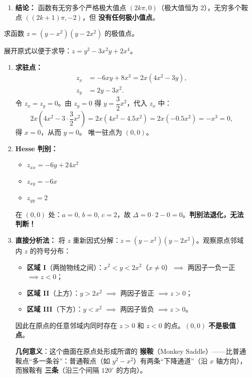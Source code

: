 \documentclass[lang=cn,11pt]{elegantbook}
\begin{document}
\begin{solution}
\begin{enumerate}
  \item \textbf{结论：}
  函数有无穷多个严格极大值点 $(2k\pi,0)$（极大值恒为 $2$），无穷多个鞍点 $((2k+1)\pi,-2)$，但 \textbf{没有任何极小值点}。
\end{enumerate}
\end{solution}

\begin{example} \label{ex:monkey-saddle}
求函数 $z=(y-x^2)(y-2x^2)$ 的极值点。
\end{example}

\begin{solution}
展开原式以便于求导：$z=y^2-3x^2y+2x^4$。

\begin{enumerate}
  \item \textbf{求驻点：}
  \begin{align*}
  z_x &= -6xy+8x^3=2x(4x^2-3y),\\
  z_y &= 2y-3x^2.
  \end{align*}
  令 $z_x=z_y=0$。由 $z_y=0$ 得 $y=\dfrac{3}{2}x^2$，代入 $z_x$ 中：
  \[
  2x\left(4x^2-3\cdot\frac{3}{2} x^2\right) = 2x(4x^2-4.5x^2) = 2x(-0.5x^2) = -x^3=0,
  \]
  得 $x=0$，从而 $y=0$。
  唯一驻点为 $(0,0)$。

  \item \textbf{Hesse 判别：}
  \begin{itemize}
    \item $z_{xx}=-6y+24x^2$
    \item $z_{xy}=-6x$
    \item $z_{yy}=2$
  \end{itemize}
  在 $(0,0)$ 处：$a=0$, $b=0$, $c=2$，故 $\Delta=0\cdot 2-0=0$。\textbf{判别法退化，无法判断！}

  \item \textbf{直接分析法：}
  将 $z$ 重新因式分解：$z=(y-x^2)(y-2x^2)$。观察原点邻域内 $z$ 的符号分布：
  \begin{itemize}
    \item \textbf{区域 I}（两抛物线之间）：$x^2<y<2x^2$（$x \neq 0$）$\implies$ 两因子一负一正 $\implies z<0$；
    \item \textbf{区域 II}（上方）：$y>2x^2$ $\implies$ 两因子皆正 $\implies z>0$；
    \item \textbf{区域 III}（下方）：$y<x^2$ $\implies$ 两因子皆负 $\implies z>0$。
  \end{itemize}
  因此在原点的任意邻域内同时存在 $z>0$ 和 $z<0$ 的点。$(0,0)$ \textbf{不是极值点}。

  \textbf{几何意义}：这个曲面在原点处形成所谓的 \textbf{猴鞍}（Monkey Saddle）——比普通鞍点“多一条谷”：普通鞍点（如 $y^2-x^2$）有两条“下降通道”（沿 $x$ 轴方向），而猴鞍有 \textbf{三条}（沿三个间隔 $120^\circ$ 的方向）。
\end{enumerate}
\end{solution}
\end{document}
